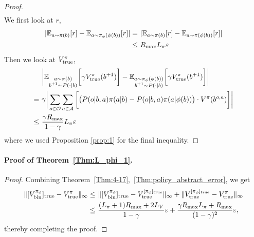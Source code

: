 \documentclass[twoside]{article}
\begin{document}
\begin{proof}
\begin{align}
    \end{align}
    We first look at $r$,
    \begin{align}
        |\mathbb{E}_{a\sim\pi(b)}[r]-\mathbb{E}_{a\sim\pi_\phi(\phi(b))}[r]|
        =&\ |\mathbb{E}_{a\sim\pi(b)}[r]-\mathbb{E}_{a\sim \pi(\phi(b))}[r]|\nonumber\\
        \leq&\ R_{\rm max}L_\pi\varepsilon
    \end{align}
    Then we look at $V^\pi_{\rm true}$,
    \begin{align}
        &\ \bigg|\mathbb{E}_{\substack{a\sim\pi(b)\\ b^{+1}\sim P(\cdot|b)}}\bigg[\gamma V_{\rm true}^\pi(b^{+1})\bigg]-\mathbb{E}_{\substack{a\sim\pi_\phi(\phi(b))\\ b^{+1}\sim P(\cdot|b)}}\bigg[\gamma V_{\rm true}^\pi(b^{+1})\bigg]\bigg|\nonumber\\
        =&\ \gamma\bigg|\sum_{o\in\mathcal{O}}\sum_{a\in\mathcal{A}}
        \bigg[\big(P(o|b,a)\pi(a|b)-P(o|b,a)\pi(a|\phi(b))\big)\cdot V^\pi(b^{o,a})\bigg]\bigg|\nonumber\\
        \leq&\ \frac{\gamma R_{\rm max}}{1-\gamma}L_\pi\varepsilon
    \end{align}
    where we used Proposition \ref{prop:1} for the final inequality.
    \end{proof}

\paragraph{Proof of Theorem~\ref{Thm:L_phi_1}.}
\begin{proof} Combining Theorem~\ref{Thm:4-17},~\ref{Thm:policy_abstract_error}, we get
\begin{align}
     \|[V^{\pi_\phi}_{\rm bin}]_{\rm true}-V^\pi_{\rm true}\|_\infty
        \leq&\ \|[V^{\pi_\phi}_{\rm bin}]_{\rm true}-V_{{\rm true}}^{[\pi_\phi]_{{\rm true}}}\|_\infty+\|V_{{\rm true}}^{[\pi_\phi]_{{\rm true}}}-
        V^\pi_{\rm true}\|_\infty\nonumber\\
        \leq&\ \frac{(L_\pi+1)R_{\rm max}+2L_V}{1-\gamma}\varepsilon
        +\frac{\gamma R_{\rm max}L_\pi+R_{\rm max}}{(1-\gamma)^2}\varepsilon,
\end{align}
thereby completing the proof.
\end{proof}
\end{document}
